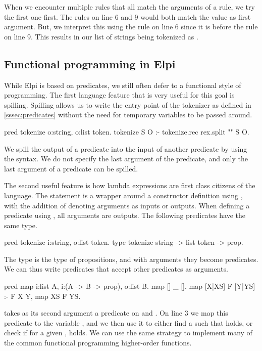 \documentclass[thesis.tex]{subfiles}
\begin{document}
{{When we encounter multiple rules that all match the arguments of a rule, we try the first one first. The rules on line 6 and 9 would both match the value \elpii{["/", "/", "="]} as first argument. But, we interpret this using the rule on line 6 since it is before the rule on line 9. This results in our list of strings being tokenized as .

\subsection{Functional programming in Elpi}
While Elpi is based on predicates, we still often defer to a functional style of programming. The first language feature that is very useful for this goal is spilling. Spilling allows us to write the entry point of the tokenizer as defined in \cref{sssec:predicates} without the need for temporary variables to be passed around.
\begin{elpicode}
  pred tokenize o:string, o:list token.
  tokenize S O :- tokenize.rec {rex.split "" S} O.
\end{elpicode}

We spill the output of a predicate into the input of another predicate by using the \elpii{{ }} syntax. We do not specify the last argument of the predicate, and only the last argument of a predicate can be spilled.

The second useful feature is how lambda expressions are first class citizens of the language. The  statement is a wrapper around a constructor definition using , with the addition of denoting arguments as inputs or outputs. When defining a predicate using , all arguments are outputs. The following predicates have the same type.
\begin{elpicode}
  pred tokenize i:string, o:list token.
  type tokenize string -> list token -> prop.
\end{elpicode}
The  type is the type of propositions, and with arguments they become predicates. We can thus write predicates that accept other predicates as arguments.
\begin{elpicode}
  pred map i:list A, i:(A -> B -> prop), o:list B.
  map [] _ [].
  map [X|XS] F [Y|YS] :- F X Y, map XS F YS.
\end{elpicode}
 takes as its second argument a predicate on  and . On line 3 we map this predicate to the variable , and we then use it to either find a  such that  holds, or check if for a given ,  holds. We can use the same strategy to implement many of the common functional programming higher-order functions.

}}
\end{document}
